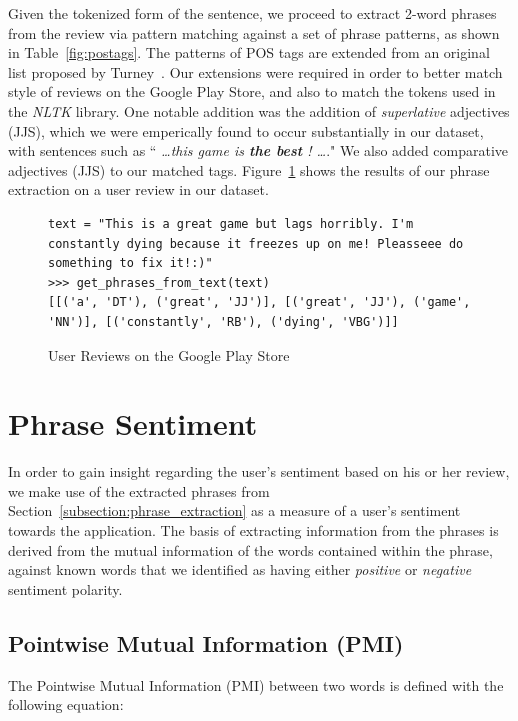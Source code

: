 \documentclass[11pt]{report} %
\begin{document}
Given the tokenized form of the sentence, we proceed to extract 2-word phrases from the review via pattern matching against a set of phrase patterns, as shown in Table~\ref{fig:postags}. The patterns of POS tags are extended from an original list proposed by Turney~\cite{Turney2001}. Our extensions were required in order to better match style of reviews on the Google Play Store, and also to match the tokens used in the \textit{NLTK} library. One notable addition was the addition of \textit{superlative} adjectives (JJS), which we were emperically found to occur substantially in our dataset, with sentences such as `` \textit{\dots this game is \textbf{the best} ! \dots}." We also added comparative adjectives (JJS) to our matched tags. Figure~\ref{fig:phrase_extraction} shows the results of our phrase extraction on a user review in our dataset.

\begin{figure}[h!]
  \centering
\begin{lstlisting}
text = "This is a great game but lags horribly. I'm constantly dying because it freezes up on me! Pleasseee do something to fix it!:)"
>>> get_phrases_from_text(text)
[[('a', 'DT'), ('great', 'JJ')], [('great', 'JJ'), ('game', 'NN')], [('constantly', 'RB'), ('dying', 'VBG')]]

\end{lstlisting}
 \caption{User Reviews on the Google Play Store}
\label{fig:phrase_extraction}
\end{figure}

\section{Phrase Sentiment}
\label{section:phrase_sentiment}
In order to gain insight regarding the user's sentiment based on his or her review, we make use of the extracted phrases from 
Section~\ref{subsection:phrase_extraction} as a measure of a user's sentiment towards the application. The basis of extracting information from the phrases is derived from the mutual information of the words contained within the phrase, against known words that we identified as having either \textit{positive} or \textit{negative} sentiment polarity. 

\subsection{Pointwise Mutual Information (PMI)}
The Pointwise Mutual Information (PMI) between two words \cite{church1990} is defined with the following equation:
\end{document}
